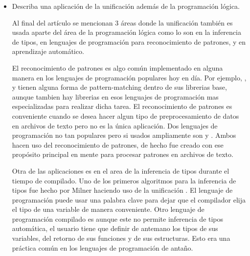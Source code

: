 \begin{enumerate}
\begin{itemize}

        \item Describa una aplicación de la unificación además de la programación lógica.
        \begin{solution}
            Al final del artículo se mencionan 3 áreas donde la unificación también es usada aparte del área de la programación lógica como lo son en la inferencia de tipos, en lenguajes de programación para reconocimiento de patrones, y en aprendizaje automático. 

            El reconocimiento de patrones es algo común implementado en alguna manera en los lenguajes de programación populares hoy en día. Por ejemplo, ,  y  tienen alguna forma de pattern-matching dentro de sus librerias base, aunque tambien hay librerias en esos lenguajes de programación mas especializadas para realizar dicha tarea. El reconocimiento de patrones es conveniente cuando se desea hacer algun tipo de preprocesamiento de datos en archivos de texto pero no es la única aplicación. Dos lenguajes de programación no tan populares pero si usados ampliamente son \href{https://en.citizendium.org/wiki/Erlang_(programming_language)/Tutorials/Pattern_Matching}{} y \href{https://en.wikipedia.org/wiki/AWK}{}. Ambos hacen uso del reconocimiento de patrones, de hecho  fue creado con ese propósito principal en mente para procesar patrones en archivos de texto.

            Otra de las aplicaciones es en el area de la inferencia de tipos durante el tiempo de compilado. Uno de los primeros algoritmos para la inferencia de tipos fue hecho por Milner haciendo uso de la unificación \cite[]{knight1989unification}. El lenguaje de programación  puede usar una palabra clave  para dejar que el compilador elija el tipo de una variable de manera conveniente. Otro lenguaje de programación compilado es  aunque este no permite inferencia de tipos automática, el usuario tiene que definir de antemano los tipos de sus variables, del retorno de sus funciones y de sus estructuras. Esto era una práctica común en los lenguajes de programación de antaño.
            

\end{solution}
\end{itemize}
\end{enumerate}

